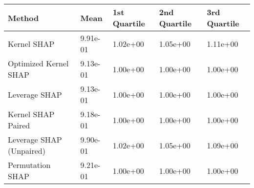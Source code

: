 \begin{tabular}{lllll}
  \toprule
  \textbf{Method} & \textbf{Mean} & \textbf{1st Quartile} & \textbf{2nd Quartile} & \textbf{3rd Quartile} \\ \midrule 
Kernel SHAP & 9.91e-01 & 1.02e+00 & 1.05e+00 & 1.11e+00\\
Optimized Kernel SHAP & \cellcolor{gold!60}9.13e-01 & \cellcolor{gold!60}1.00e+00 & \cellcolor{gold!60}1.00e+00 & \cellcolor{gold!60}1.00e+00\\
Leverage SHAP & \cellcolor{gold!60}9.13e-01 & \cellcolor{gold!60}1.00e+00 & \cellcolor{gold!60}1.00e+00 & \cellcolor{gold!60}1.00e+00\\
Kernel SHAP Paired & \cellcolor{bronze!60}9.18e-01 & \cellcolor{gold!60}1.00e+00 & \cellcolor{gold!60}1.00e+00 & \cellcolor{gold!60}1.00e+00\\
Leverage SHAP (Unpaired) & 9.90e-01 & 1.02e+00 & 1.05e+00 & 1.09e+00\\
Permutation SHAP & 9.21e-01 & \cellcolor{gold!60}1.00e+00 & \cellcolor{gold!60}1.00e+00 & \cellcolor{gold!60}1.00e+00\\
\bottomrule
\end{tabular}